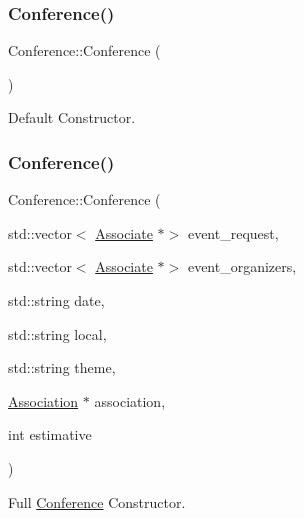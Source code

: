 \subsubsection{\texorpdfstring{Conference()}{Conference()}\hspace{0.1cm}{\footnotesize\ttfamily [1/3]}}
{\footnotesize\ttfamily Conference\+::\+Conference (\begin{DoxyParamCaption}{ }\end{DoxyParamCaption})}



Default Constructor. 

\mbox{\label{classConference_a23b9a4644d1608f8f33400a6e41b32df}} 
\subsubsection{\texorpdfstring{Conference()}{Conference()}\hspace{0.1cm}{\footnotesize\ttfamily [2/3]}}
{\footnotesize\ttfamily Conference\+::\+Conference (\begin{DoxyParamCaption}\item[{std\+::vector$<$ \hyperlink{classAssociate}{Associate} $\ast$$>$}]{event\+\_\+request,  }\item[{std\+::vector$<$ \hyperlink{classAssociate}{Associate} $\ast$$>$}]{event\+\_\+organizers,  }\item[{std\+::string}]{date,  }\item[{std\+::string}]{local,  }\item[{std\+::string}]{theme,  }\item[{\hyperlink{classAssociation}{Association} $\ast$}]{association,  }\item[{int}]{estimative }\end{DoxyParamCaption})}



Full \hyperlink{classConference}{Conference} Constructor. 


